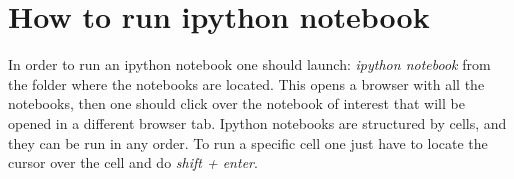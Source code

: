 \documentclass[11pt,a4paper]{article}
\begin{document}
\section*{How to run ipython notebook}

In order to run an ipython notebook one should launch: \textit{ipython notebook} from the folder where the notebooks are located. This opens a browser with all the notebooks, then one should click over the notebook of interest that will be opened in a different browser tab. Ipython notebooks are structured by cells, and they can be run in any order. To run a specific cell one just have to locate the cursor over the cell and do \textit{shift + enter}.  
\end{document}
